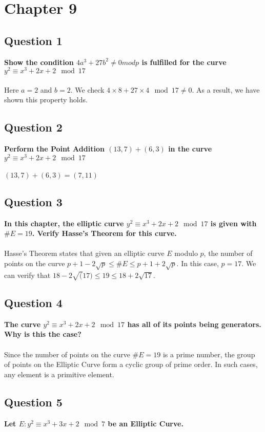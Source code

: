 \documentclass[titlepage]{article}
\begin{document}
\section{Chapter 9}
{
\subsection{Question 1}
{
\textbf{Show the condition \(4a^3 + 27b^2 \neq 0 mod p\) is fulfilled for the curve \(y^2 \equiv x^3 + 2x + 2 \mod 17\)}\\\\
Here \(a = 2\) and \(b = 2\). We check \(4 \times 8 + 27 \times 4 \mod 17 \neq 0\). As a result, we have shown this property holds.
}
\subsection{Question 2}
{
\textbf{Perform the Point Addition \((13, 7) + (6, 3)\) in the curve \(y^2 \equiv x^3 + 2x + 2 \mod 17\)}\\\\
\((13, 7) + (6, 3) = (7, 11)\)
}
\subsection{Question 3}
{
\textbf{In this chapter, the elliptic curve \(y^2 \equiv x^3 + 2x + 2 \mod 17\) is given with \(\#E = 19\). Verify Hasse's Theorem for this curve.}\\\\
Hasse's Theorem states that given an elliptic curve \(E\) modulo \(p\), the number of points on the curve \(p + 1 - 2\sqrt{p} \le \#E \le p + 1 + 2\sqrt{p}\). In this case, \(p = 17\). We can verify that \(18 - 2\sqrt(17) \le 19 \le 18 + 2\sqrt{17}\).
}
\subsection{Question 4}
{
\textbf{The curve \(y^2 \equiv x^3 + 2x + 2 \mod 17\) has all of its points being generators. Why is this the case?}\\\\
Since the number of points on the curve \(\#E = 19\) is a prime number, the group of points on the Elliptic Curve form a cyclic group of prime order. In such cases, any element is a primitive element. 
}
\subsection{Question 5}
{
\textbf{Let \(E : y^2 \equiv x^3 + 3x + 2 \mod 7\) be an Elliptic Curve.}
}}
\end{document}
